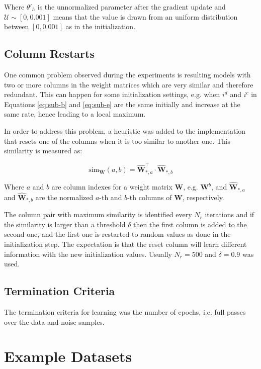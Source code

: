 Where $\theta'_{h}$ is the unnormalized parameter after the gradient update and $\mathcal{U} \sim [0, 0.001]$ means that the value is drawn from an uniform distribution between $[0, 0.001]$ as in the initialization.

\subsection{Column Restarts}

One common problem observed during the experiments is resulting models with two or more columns in the weight matrices which are very similar and therefore redundant. This can happen for some initialization settings, e.g. when $i^{d}$ and $i^{c}$ in Equations \eqref{eq:sub-b} and \eqref{eq:sub-e} are the same initially and increase at the same rate, hence leading to a local maximum.

In order to address this problem, a heuristic was added to the implementation that resets one of the columns when it is too similar to another one. This similarity is measured as:

\begin{equation}
  \mathrm{sim}_{\mathbf{W}}(a,b) = \hat{\mathbf{W}}_{*,a}^{\intercal} \cdot \hat{\mathbf{W}}_{*,b}
\end{equation}

Where $a$ and $b$ are column indexes for a weight matrix $\mathbf{W}$, e.g. $\mathbf{W}^{b}$, and $\hat{\mathbf{W}}_{*,a}$ and $\hat{\mathbf{W}}_{*,b}$ are the normalized $a$-th and $b$-th columns of $\mathbf{W}$, respectively.

The column pair with maximum similarity is identified every $N_{r}$ iterations and if the similarity is larger than a threshold $\delta$ then the first column is added to the second one, and the first one is restarted to random values as done in the initialization step. The expectation is that the reset column will learn different information with the new initialization values. Usually $N_{r} = 500$ and $\delta = 0.9$ was used.

\subsection{Termination Criteria}

The termination criteria for learning was the number of epochs, i.e. full passes over the data and noise samples.

\section{Example Datasets}

